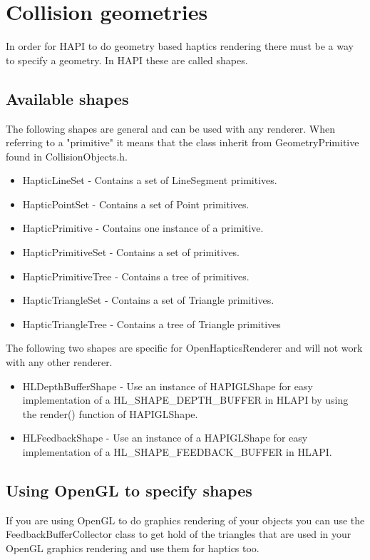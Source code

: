 \chapter{Collision geometries}
In order for HAPI to do geometry based haptics rendering there must be a way to
specify a geometry. In HAPI these are called shapes.

\section{Available shapes}
The following shapes are general and can be used with any renderer. When
referring to a "primitive" it means that the class inherit from
GeometryPrimitive found in CollisionObjects.h.
\begin{itemize}
\item HapticLineSet - Contains a set of LineSegment primitives.
\item HapticPointSet - Contains a set of Point primitives.
\item HapticPrimitive - Contains one instance of a primitive.
\item HapticPrimitiveSet - Contains a set of primitives.
\item HapticPrimitiveTree - Contains a tree of primitives.
\item HapticTriangleSet - Contains a set of Triangle primitives.
\item HapticTriangleTree - Contains a tree of Triangle primitives
\end{itemize}

The following two shapes are specific for OpenHapticsRenderer and will not
work with any other renderer.
\begin{itemize}
\item HLDepthBufferShape - Use an instance of HAPIGLShape for easy
implementation of a HL\-\_SHAPE\-\_DEPTH\-\_BUFFER in HLAPI by using the render()
function of HAPIGLShape.
\item HLFeedbackShape - Use an instance of a HAPIGLShape for easy
implementation of a HL\-\_SHAPE\-\_FEEDBACK\-\_BUFFER in HLAPI.
\end{itemize}

\section{Using OpenGL to specify shapes}
If you are using OpenGL to do graphics rendering of your objects you
can use the FeedbackBufferCollector class to get hold of the triangles
that are used in your OpenGL graphics rendering and use them for
haptics too. 

